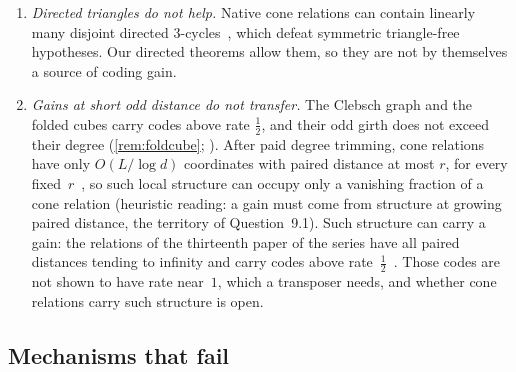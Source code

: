 \begin{enumerate}[label=(N\arabic*),leftmargin=3em]
one-way parents, a vertex with two one-way arcs into one component, or a component of none of the three kinds). The
relation $\Ex$ of \cref{rem:X15} has the first two features but not the third: it has a global certificate.
\item\label{it:N3} \emph{Directed triangles do not help.} Native cone relations can contain linearly many disjoint directed
$3$-cycles~\cite[Proposition~3.10]{DirectedRecovery2026}, which defeat symmetric triangle-free hypotheses. Our directed
theorems allow them, so they are not by themselves a source of coding gain.
\item\label{it:N4} \emph{Gains at short odd distance do not transfer.} The Clebsch graph and the folded cubes carry codes
above rate $\frac12$, and their odd girth does not exceed their degree (\cref{rem:foldcube};
\cite[Corollary~6.11]{FourthPaper2026}). After paid degree trimming, cone relations have only $O(L/\log d)$ coordinates with
paired distance at most $r$, for every fixed~$r$~\cite[Theorem~3.3]{DirectedRecovery2026}, so such local structure can occupy only a vanishing fraction of a cone relation (heuristic
reading: a gain must come from structure at growing paired distance, the territory of Question~9.1). Such structure can
carry a gain: the relations of the thirteenth paper of the series have all paired distances tending to infinity and
carry codes above rate~$\frac12$~\cite[Theorem~A]{StorageCodes2026}. Those codes are not shown to have rate near~$1$,
which a transposer needs, and whether cone relations carry such structure is open.
\end{enumerate}

\subsection{Mechanisms that fail}\label{sec:con-fail}

